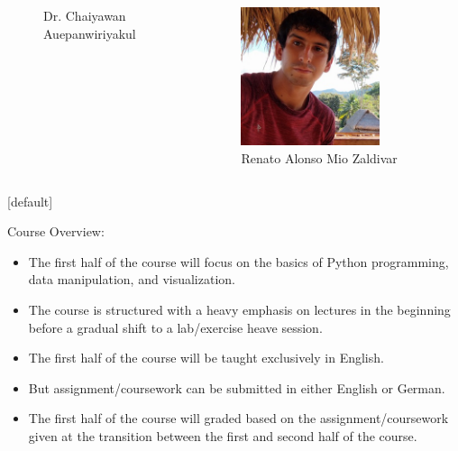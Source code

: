 \documentclass{beamer}
\begin{document}
\begin{frame}
\begin{columns}[c]
\begin{column}{.33\textwidth}
\begin{figure}
                    \caption{Dr. Chaiyawan Auepanwiriyakul}
                    \label{fig:chaiyawan}
                \end{figure}
            \end{column}
            \begin{column}{.33\textwidth}
                \begin{figure}
                    \centering
                    \includegraphics[width=0.75\textwidth]{figures/renato.jpeg}
                    \caption{Renato Alonso Mio Zaldivar}
                    \label{fig:renato}
                \end{figure}
            \end{column}
        \end{columns}
    \end{frame}
    [default]
    \begin{frame}
        Course Overview:
        \begin{itemize}
            \item The first half of the course will focus on the basics of Python programming, data manipulation, and visualization.
            \item The course is structured with a heavy emphasis on lectures in the beginning before a gradual shift to a lab/exercise heave session.
            \item The first half of the course will be taught exclusively in English.
            \item But assignment/coursework can be submitted in either English or German.
            \item The first half of the course will graded based on the assignment/coursework given at the transition between the first and second half of the course.
        \end{itemize}
    \end{frame}
        
\end{document}
